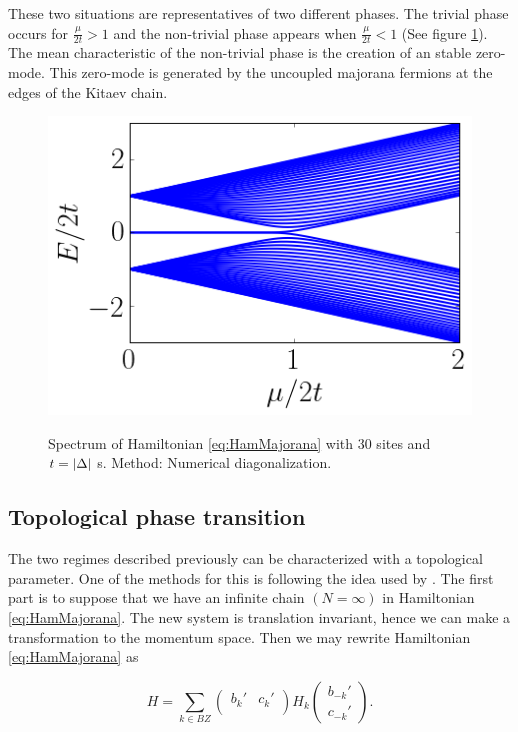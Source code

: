 These two situations are representatives of two different phases. The trivial phase occurs for $\frac{\mu}{2t}>1$ and the non-trivial phase appears when $\frac{\mu}{2t}<1$ (See figure \ref{fig:KitaevSpec}). The mean characteristic of the non-trivial phase is the creation of an stable zero-mode. This zero-mode is generated by the  uncoupled majorana fermions at the edges of the Kitaev chain.  \\



\begin{figure}[t]
    \centering
    \includegraphics[scale=0.5]{IMAGES/Majorana/Spectrum.png}
    \label{fig:KitaevSpec}
    \caption{Spectrum of Hamiltonian \eqref{eq:HamMajorana} with $30$ sites and $t=\vert \Delta \vert$ s. Method: Numerical diagonalization. \protect {} }
\end{figure}



\subsection{Topological phase transition}

The two regimes described previously  can be characterized with a topological parameter.  One of the methods for this is following the idea used by \citeauthor{alicea_new_2012}\cite{alicea_new_2012}. The first part is to suppose that we have an infinite chain $(N=\infty)$ in Hamiltonian \eqref{eq:HamMajorana}. The new system is translation invariant, hence we can make a transformation to the momentum space. Then we may rewrite Hamiltonian \eqref{eq:HamMajorana}  as

\begin{equation}
    H = 
    \sum_{k \in BZ} 
    \begin{pmatrix} 
      b_k'  & c_{k}'\\  
    \end{pmatrix}
    H_k 
    \begin{pmatrix} 
      b_{-k}'     \\ 
      c_{-k}' 
    \end{pmatrix}.
    \label{PBCHam2}
\end{equation}

